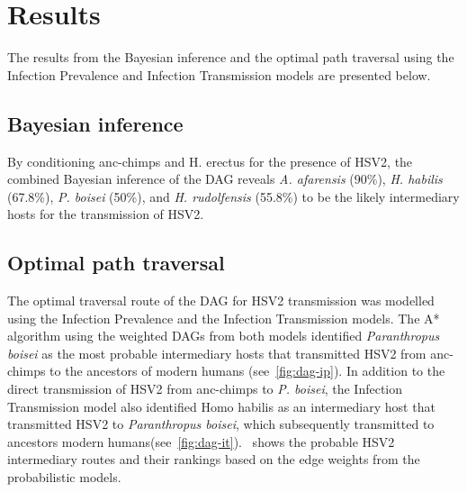 \documentclass[fleqn,10pt]{wlscirep}
\begin{document}
\section*{Results}

The results from the Bayesian inference and the optimal path traversal using the Infection Prevalence and Infection Transmission models are presented below.

\subsection*{Bayesian inference}
By conditioning anc-chimps and H. erectus for the presence of HSV2, the combined Bayesian inference of the DAG reveals \textit{A. afarensis} (90\%), \textit{H. habilis} (67.8\%), \textit{P. boisei}  (50\%), and \textit{H. rudolfensis} (55.8\%) to be the likely intermediary hosts for the transmission of HSV2.

\subsection*{Optimal path traversal}
The optimal traversal route of the DAG for HSV2 transmission was modelled using the Infection Prevalence and the Infection Transmission models. The A* algorithm using the weighted DAGs from both models identified \textit{Paranthropus boisei} as the most probable intermediary hosts that transmitted HSV2 from anc-chimps to the ancestors of modern humans (see~\cref{fig:dag-ip}). In addition to the direct transmission of HSV2 from anc-chimps to \textit{P. boisei}, the Infection Transmission model also identified Homo habilis as an intermediary host that transmitted HSV2 to \textit{Paranthropus boisei}, which subsequently transmitted to ancestors modern humans(see~\cref{fig:dag-it}).~ shows the probable HSV2 intermediary routes and their rankings based on the edge weights from the probabilistic models. 
\end{document}
